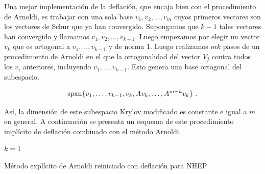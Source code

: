 \documentclass[a4paper,openright,12pt, oneside]{book}
\DeclarePairedDelimiter\norm{\lVert}{\rVert}
\begin{document}
Una mejor implementaci\'on de la deflaci\'on, que encaja bien con el procedimiento de Arnoldi, es trabajar con una sola base $ v_1, v_2, \ldots, v_m $ cuyos primeros vectores son los vectores de Schur que ya han convergido. Supongamos que $ k-1 $ tales vectores han convergido y llamamos $ v_1, v_2
, \ldots, v_ {k-1} $. Luego empezamos por elegir un vector $ v_k $ que es ortogonal a $ v_1, \ldots, v_ {k-1} $ y de norma 1. Luego realizamos $ mk $ pasos de un procedimiento de Arnoldi en el que la ortogonalidad del vector $ V_j $ contra todos los $ v_i $ anteriores, incluyendo $ v_1, \ldots, v_ {k-1} $. Esto genera una base ortogonal del subespacio. 

\begin{displaymath}
\label{set:base}
{\rm span}\{ v_1,\ldots, v_{k-1} , v_k, A v_k, \ldots, A^{m-k} v_k \} \ .
\end{displaymath} 

As\'i, la dimensi\'on de este subespacio Krylov modificado es constante e igual a $ m $ en general. A continuaci\'on se presenta un esquema de este procedimiento impl\'icito de deflaci\'on combinado con el m\'etodo Arnoldi.


\begin{algorithm}
    \label{alg:ERAMDEF}

    $k = 1 $ \\
    \caption{M\'etodo expl\'icito de Arnoldi reiniciado con deflaci\'on para NHEP}
\end{algorithm}
\end{document}
